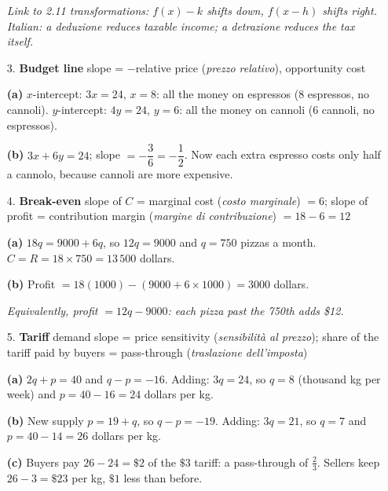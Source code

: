 \documentclass[12pt, twoside]{article}
\newcommand{\ita}[1]{(\emph{#1})}
\begin{document}
\begin{enumerate}[itemsep=0.3cm]
\emph{Link to 2.11 transformations: $f(x) - k$ shifts down, $f(x - h)$
shifts right. Italian: a deduzione reduces taxable income; a detrazione
reduces the tax itself.}

\item[3.] \textbf{Budget line} \quad slope = $-$relative price
\ita{prezzo relativo}, opportunity cost

\textbf{(a)} $x$-intercept: $3x = 24$, $x = 8$: all the money on espressos
($8$ espressos, no cannoli). $y$-intercept: $4y = 24$, $y = 6$: all the
money on cannoli ($6$ cannoli, no espressos).

\textbf{(b)} $3x + 6y = 24$; slope $= -\dfrac{3}{6} = -\dfrac{1}{2}$. Now
each extra espresso costs only half a cannolo, because cannoli are more
expensive.

\item[4.] \textbf{Break-even} \quad slope of $C$ = marginal cost
\ita{costo marginale} $= 6$; slope of profit = contribution margin
\ita{margine di contribuzione} $= 18 - 6 = 12$

\textbf{(a)} $18q = 9000 + 6q$, so $12q = 9000$ and $q = 750$ pizzas a
month. $C = R = 18 \times 750 = 13\,500$ dollars.

\textbf{(b)} Profit $= 18(1000) - (9000 + 6 \times 1000) = 3000$ dollars.

\emph{Equivalently, profit $= 12q - 9000$: each pizza past the 750th adds
\$12.}

\item[5.] \textbf{Tariff} \quad demand slope = price sensitivity
\ita{sensibilità al prezzo}; share of the tariff paid by buyers =
pass-through \ita{traslazione dell'imposta}

\textbf{(a)} $2q + p = 40$ and $q - p = -16$. Adding: $3q = 24$, so
$q = 8$ (thousand kg per week) and $p = 40 - 16 = 24$ dollars per kg.

\textbf{(b)} New supply $p = 19 + q$, so $q - p = -19$. Adding:
$3q = 21$, so $q = 7$ and $p = 40 - 14 = 26$ dollars per kg.

\textbf{(c)} Buyers pay $26 - 24 = \$2$ of the $\$3$ tariff: a pass-through
of $\frac{2}{3}$. Sellers keep $26 - 3 = \$23$ per kg, $\$1$ less than
before.


\end{enumerate}
\end{document}
